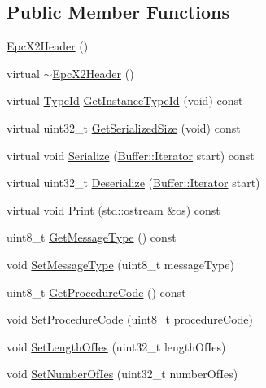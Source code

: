 \subsection*{Public Member Functions}
\begin{DoxyCompactItemize}
\item 
\hyperlink{classns3_1_1EpcX2Header_adf17f0e7e2610ad2c5e56124d4587bcf}{Epc\+X2\+Header} ()
\item 
virtual \hyperlink{classns3_1_1EpcX2Header_a4aa755a5d6674a3dab8a836474a5fc5e}{$\sim$\+Epc\+X2\+Header} ()
\item 
virtual \hyperlink{classns3_1_1TypeId}{Type\+Id} \hyperlink{classns3_1_1EpcX2Header_a1d67b4c019a775e083cdeff83e9c997d}{Get\+Instance\+Type\+Id} (void) const 
\item 
virtual uint32\+\_\+t \hyperlink{classns3_1_1EpcX2Header_a06a9641e86102bdb6ef0ae9b4f27c50c}{Get\+Serialized\+Size} (void) const 
\item 
virtual void \hyperlink{classns3_1_1EpcX2Header_a7a55059025f3cab2c73514356ec565a1}{Serialize} (\hyperlink{classns3_1_1Buffer_1_1Iterator}{Buffer\+::\+Iterator} start) const 
\item 
virtual uint32\+\_\+t \hyperlink{classns3_1_1EpcX2Header_a82e58d8c30d9b8b58ee4ed8e61cffc52}{Deserialize} (\hyperlink{classns3_1_1Buffer_1_1Iterator}{Buffer\+::\+Iterator} start)
\item 
virtual void \hyperlink{classns3_1_1EpcX2Header_a4e8ddaca77b69b901c2cb04c4e5ff01e}{Print} (std\+::ostream \&os) const 
\item 
uint8\+\_\+t \hyperlink{classns3_1_1EpcX2Header_a55fb3cf1c06b309b48b3733a2514fc5c}{Get\+Message\+Type} () const 
\item 
void \hyperlink{classns3_1_1EpcX2Header_af2bab4ed2d932dfd0f64379e944dcb1d}{Set\+Message\+Type} (uint8\+\_\+t message\+Type)
\item 
uint8\+\_\+t \hyperlink{classns3_1_1EpcX2Header_ae4b950d0f7a4f8bb62e734ed22c94c8b}{Get\+Procedure\+Code} () const 
\item 
void \hyperlink{classns3_1_1EpcX2Header_a5babbdbdbfc729b739f742f093835be2}{Set\+Procedure\+Code} (uint8\+\_\+t procedure\+Code)
\item 
void \hyperlink{classns3_1_1EpcX2Header_a1f852bc76571ddbb1d4574ffc851aafb}{Set\+Length\+Of\+Ies} (uint32\+\_\+t length\+Of\+Ies)
\item 
void \hyperlink{classns3_1_1EpcX2Header_aac0402d3bfb8b0bb574490012a7713a0}{Set\+Number\+Of\+Ies} (uint32\+\_\+t number\+Of\+Ies)
\end{DoxyCompactItemize}
